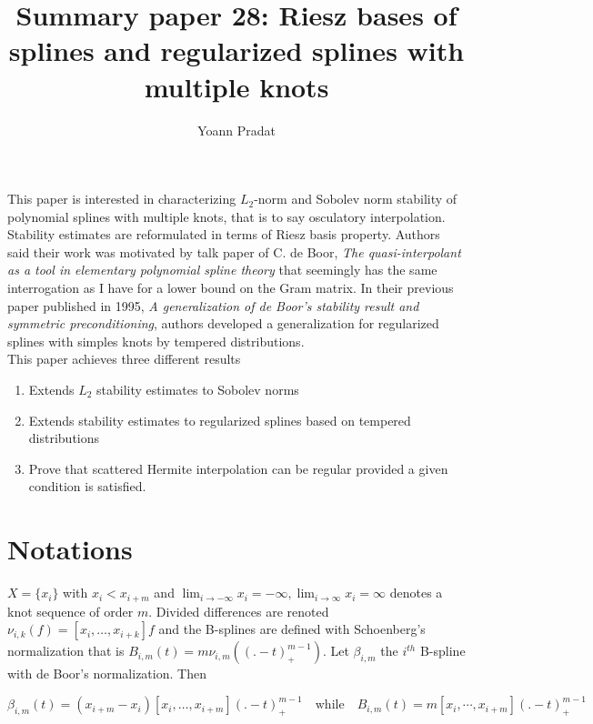 \documentclass[a4paper, 11pt]{article}
\begin{document}
\title{Summary paper 28: Riesz bases of splines and regularized splines with multiple knots}
\author{Yoann Pradat}
\maketitle

This paper is interested in characterizing $L_2$-norm and Sobolev norm stability of polynomial splines with multiple 
knots, that is to say osculatory interpolation. Stability estimates are reformulated in terms of Riesz basis property.  
Authors said their work was motivated by talk paper of C. de Boor, \emph{The quasi-interpolant as a tool in elementary 
polynomial spline theory} that seemingly has the same interrogation as I have for a lower bound on the Gram matrix. In 
their previous paper published in 1995, \emph{A generalization of de Boor's stability result and symmetric
preconditioning}, authors developed a generalization for regularized splines with simples knots by tempered 
distributions. \\

This paper achieves three different results
\begin{enumerate}
  \item Extends $L_2$ stability estimates to Sobolev norms
  \item Extends stability estimates to regularized splines based on tempered distributions
  \item Prove that scattered Hermite interpolation can be regular provided a given condition is satisfied.
\end{enumerate}

\section{Notations} 

$X = \{x_i\}$ with $x_i < x_{i+m}$ and $\lim_{i \to -\infty} x_i = -\infty,  \lim_{i \to \infty} x_i = \infty$ denotes a 
knot sequence of order $m$. Divided differences are renoted $\nu_{i,k}(f) = [x_i, \ldots, x_{i+k}]f$ and the B-splines 
are defined with Schoenberg's normalization that is $B_{i,m}(t) = m \nu_{i,m}({(.-t)}_{+}^{m-1})$. Let $\beta_{i,m}$ the 
$i^{th}$ B-spline with de Boor's normalization. Then

\begin{equation*}
  \beta_{i,m}(t) = (x_{i+m} - x_i) [x_i, \ldots, x_{i+m}]{(.-t)}_+^{m-1} \quad \text{while} \quad B_{i,m}(t) = m[x_i, 
  \cdots, x_{i+m}]{(.-t)}_+^{m-1}
\end{equation*}
\end{document}
